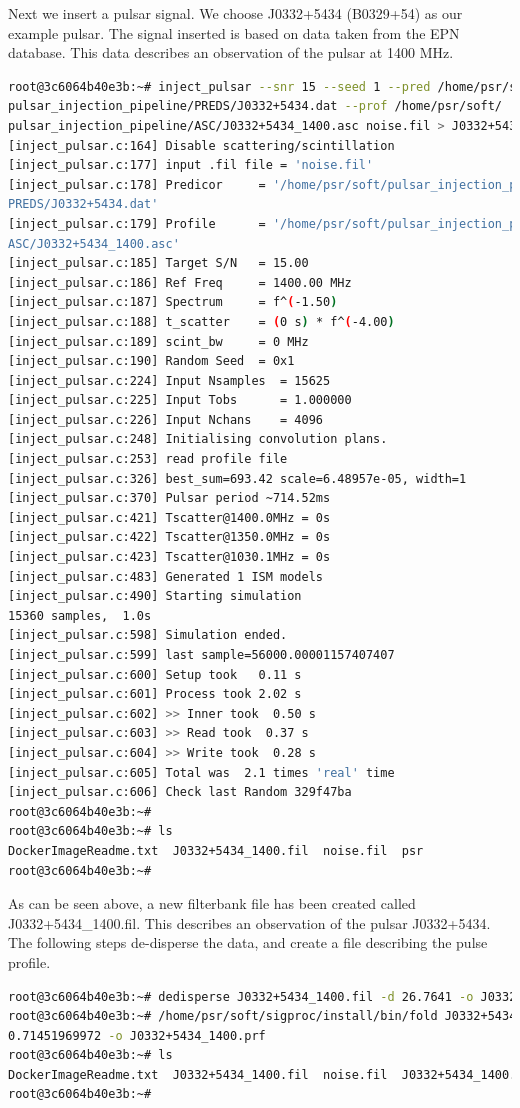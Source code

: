 \documentclass[preprint,authoryear,5p,twocolumn]{elsarticle_mod}
\begin{document}
\noindent\begin{minipage}{.95\textwidth}
Next we insert a pulsar signal. We choose J0332+5434 (B0329+54) as our example pulsar. The signal inserted is based on data taken from the EPN database. This data describes an observation of the pulsar at 1400 MHz.

\begin{lstlisting}[language=bash]
root@3c6064b40e3b:~# inject_pulsar --snr 15 --seed 1 --pred /home/psr/soft/
pulsar_injection_pipeline/PREDS/J0332+5434.dat --prof /home/psr/soft/
pulsar_injection_pipeline/ASC/J0332+5434_1400.asc noise.fil > J0332+5434_1400.fil 
[inject_pulsar.c:164] Disable scattering/scintillation 
[inject_pulsar.c:177] input .fil file = 'noise.fil' 
[inject_pulsar.c:178] Predicor     = '/home/psr/soft/pulsar_injection_pipeline/
PREDS/J0332+5434.dat' 
[inject_pulsar.c:179] Profile      = '/home/psr/soft/pulsar_injection_pipeline/
ASC/J0332+5434_1400.asc' 
[inject_pulsar.c:185] Target S/N   = 15.00 
[inject_pulsar.c:186] Ref Freq     = 1400.00 MHz 
[inject_pulsar.c:187] Spectrum     = f^(-1.50) 
[inject_pulsar.c:188] t_scatter    = (0 s) * f^(-4.00) 
[inject_pulsar.c:189] scint_bw     = 0 MHz 
[inject_pulsar.c:190] Random Seed  = 0x1 
[inject_pulsar.c:224] Input Nsamples  = 15625 
[inject_pulsar.c:225] Input Tobs      = 1.000000 
[inject_pulsar.c:226] Input Nchans    = 4096 
[inject_pulsar.c:248] Initialising convolution plans. 
[inject_pulsar.c:253] read profile file 
[inject_pulsar.c:326] best_sum=693.42 scale=6.48957e-05, width=1 
[inject_pulsar.c:370] Pulsar period ~714.52ms 
[inject_pulsar.c:421] Tscatter@1400.0MHz = 0s 
[inject_pulsar.c:422] Tscatter@1350.0MHz = 0s 
[inject_pulsar.c:423] Tscatter@1030.1MHz = 0s 
[inject_pulsar.c:483] Generated 1 ISM models 
[inject_pulsar.c:490] Starting simulation 
15360 samples,  1.0s 
[inject_pulsar.c:598] Simulation ended. 
[inject_pulsar.c:599] last sample=56000.00001157407407 
[inject_pulsar.c:600] Setup took   0.11 s 
[inject_pulsar.c:601] Process took 2.02 s 
[inject_pulsar.c:602] >> Inner took  0.50 s 
[inject_pulsar.c:603] >> Read took  0.37 s 
[inject_pulsar.c:604] >> Write took  0.28 s 
[inject_pulsar.c:605] Total was  2.1 times 'real' time 
[inject_pulsar.c:606] Check last Random 329f47ba 
root@3c6064b40e3b:~# 
root@3c6064b40e3b:~# ls 
DockerImageReadme.txt  J0332+5434_1400.fil  noise.fil  psr 
root@3c6064b40e3b:~#
\end{lstlisting}
As can be seen above, a new filterbank file has been created called J0332+5434\_1400.fil. This describes an observation of the pulsar J0332+5434. The following steps de-disperse the data, and create a file describing the pulse profile. 
\begin{lstlisting}[language=bash]
root@3c6064b40e3b:~# dedisperse J0332+5434_1400.fil -d 26.7641 -o J0332+5434_1400.tim 
root@3c6064b40e3b:~# /home/psr/soft/sigproc/install/bin/fold J0332+5434_1400.tim -p
0.71451969972 -o J0332+5434_1400.prf 
root@3c6064b40e3b:~# ls 
DockerImageReadme.txt  J0332+5434_1400.fil  noise.fil  J0332+5434_1400.prf  J0332+5434_1400.tim  psr 
root@3c6064b40e3b:~#  
\end{lstlisting}\end{minipage}\clearpage
\end{document}
